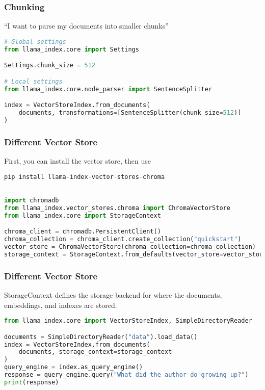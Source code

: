 \begin{frame}[fragile]\frametitle{Chunking}

``I want to parse my documents into smaller chunks''


\begin{lstlisting}[language=Python]
# Global settings
from llama_index.core import Settings

Settings.chunk_size = 512

# Local settings
from llama_index.core.node_parser import SentenceSplitter

index = VectorStoreIndex.from_documents(
    documents, transformations=[SentenceSplitter(chunk_size=512)]
)
\end{lstlisting}
\end{frame}

\begin{frame}[fragile]\frametitle{Different Vector Store}

First, you can install the vector store, then use


\begin{lstlisting}[language=Python]
pip install llama-index-vector-stores-chroma

---
import chromadb
from llama_index.vector_stores.chroma import ChromaVectorStore
from llama_index.core import StorageContext

chroma_client = chromadb.PersistentClient()
chroma_collection = chroma_client.create_collection("quickstart")
vector_store = ChromaVectorStore(chroma_collection=chroma_collection)
storage_context = StorageContext.from_defaults(vector_store=vector_store)
\end{lstlisting}
\end{frame}

\begin{frame}[fragile]\frametitle{Different Vector Store}

StorageContext defines the storage backend for where the documents, embeddings, and indexes are stored. 

\begin{lstlisting}[language=Python]
from llama_index.core import VectorStoreIndex, SimpleDirectoryReader

documents = SimpleDirectoryReader("data").load_data()
index = VectorStoreIndex.from_documents(
    documents, storage_context=storage_context
)
query_engine = index.as_query_engine()
response = query_engine.query("What did the author do growing up?")
print(response)
\end{lstlisting}
\end{frame}


